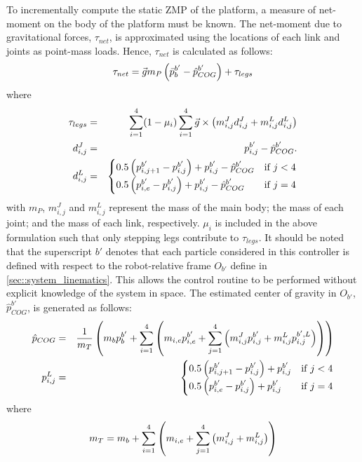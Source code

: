 		To incrementally compute the static ZMP of the platform, a measure of net-moment on the body of the platform must be known. The net-moment due to gravitational forces, $\tau_{net}$, is approximated using the locations of each link and joints as point-mass loads. Hence, $\tau_{net}$ is calculated as follows:
			\begin{equation}
				\tau_{net} 	= \vec{g} m_{P}  \left(\bar{p}_{b}^{b'}-\hat{p}_{COG}^{b'} \right)	+ \tau_{legs}
				\label{eq::NetMoment}
			\end{equation}
		where
			\begin{eqnarray*}
					\tau_{legs}		& = & \sum_{i=1}^{4} (1-\mu_{i})  \sum_{i=1}^{4} \vec{g} \times  \left( m_{i,j}^{J} d_{i,j}^{J} + m_{i,j}^{L} d_{i,j}^{L} \right)	\nonumber \\
					d_{i,j}^{J} 	& = & {{p}_{i,j}^{b'}-\hat{p}_{COG}^{b'}.} \nonumber \\														
					d_{i,j}^{L} 	& = &
					\begin{cases}
					{ 0.5  \left({p}_{i,j+1}^{b'}-{p}_{i,j}^{b'}\right) + {p}_{i,j}^{b'} - \hat{p}_{COG}^{b'}} 	&\text{if } j < 4 \\
					{ 0.5  \left({p}_{i,e}^{b'}-{p}_{i,j}^{b'}\right) + {p}_{i,j}^{b'} - \hat{p}_{COG}^{b'}} 		&\text{if } j = 4
					\end{cases} \nonumber
				\label{eq::Levers}
			\end{eqnarray*}
		with $m_{P}$, $m_{i,j}^{J}$ and $m_{i,j}^{L}$ represent the mass of the main body; the mass of each joint; and the mass of each link, respectively. $\mu_{i}$ is included in the above formulation such that only stepping legs contribute to  $\tau_{legs}$. It should be noted that the superscript ${b'}$ denotes that each particle considered in this controller is defined with respect to the robot-relative frame $O_{b'}$ define in \ref{sec::system_linematics}. This allows the control routine to be performed without explicit knowledge of the system in space. The estimated center of gravity in $O_{b'}$, $\hat{p}_{COG}^{b'}$, is generated as follows:
			\begin{eqnarray*}
				\hat{p}_{COG} 	& = & \frac{1}{m_{T}}\left( m_{b}p_{b}^{b'} + \sum_{i=1}^{4} \left(m_{i,e}{p}_{i,e}^{b'} + \sum_{j=1}^{4} \left(  m_{i,j}^{J}{p}_{i,j}^{b'} +  m_{i,j}^{L}{p}_{i,j}^{b',L} \right) \right)\right) 	\nonumber \\
				{p}_{i,j}^{L} 	& = & 
					\begin{cases}
					{ 0.5  \left({p}_{i,j+1}^{b'}-{p}_{i,j}^{b'}\right) + {p}_{i,j}^{b'} } 	&\text{if } j < 4 \\
					{ 0.5  \left({p}_{i,e}^{b'}-{p}_{i,j}^{b'}\right) + {p}_{i,j}^{b'} } 		&\text{if } j = 4
					\end{cases} \nonumber
				\label{eq::cog_estimate}
			\end{eqnarray*}
		where
			\begin{equation}
				m_{T} = m_{b} + \sum_{i=1}^{4} \left(m_{i,e} + \sum_{j=1}^{4} \left(  m_{i,j}^{J} +  m_{i,j}^{L} \right) \right)
			\end{equation}

